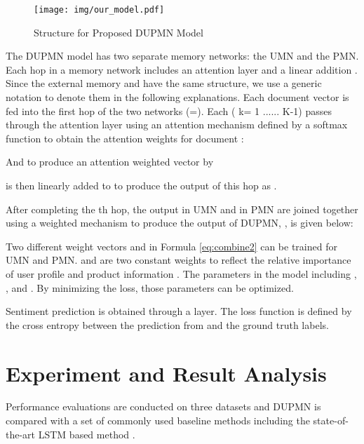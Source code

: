 \documentclass[11pt,a4paper]{article}
\begin{document}
\begin{figure*}[h]
\texttt{[image: img/our\_model.pdf]}
\caption{Structure for Proposed DUPMN Model}
\label{fig:ours}
\end{figure*}

The DUPMN model has two separate memory networks: the UMN and the PMN. Each hop in a memory network includes an attention layer  and a linear addition . Since the external memory  and  have the same structure, we use a generic notation  to denote them in the following explanations. Each document vector  is fed into the first hop of the two networks (=). Each ( k= 1 ...... K-1) passes through the attention layer using an attention mechanism defined by a softmax function to obtain the attention weights  for document :


And to produce an attention weighted vector  by 

 is then linearly added to  to produce the output of this hop as .

After completing the th hop, the output  in UMN and  in PMN are joined together using a weighted mechanism to produce the output of DUPMN, , is given below: 

Two different weight vectors  and  in Formula \ref{eq:combine2} can be trained for UMN and PMN.  and  are two constant weights to reflect the relative importance of user profile  and product information . 
The parameters in the model including , ,  and . By minimizing the loss, those parameters can be optimized. 

Sentiment prediction is obtained through a  layer. The loss function is defined by the cross entropy between the prediction from  and the ground truth labels.

\section{Experiment and Result Analysis}\label{sec:Experiment}
Performance evaluations are conducted on three datasets and DUPMN is compared with a set of commonly used baseline methods including the state-of-the-art LSTM based method \cite{chen2016neural,wu2018improving}.
\end{document}
